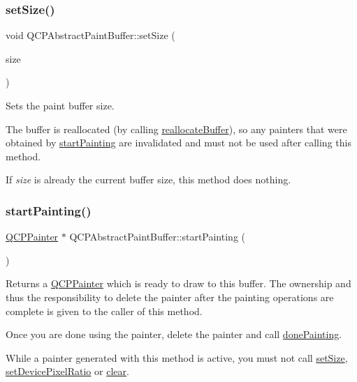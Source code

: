 \subsubsection{\texorpdfstring{set\+Size()}{setSize()}}
{\footnotesize\ttfamily void Q\+C\+P\+Abstract\+Paint\+Buffer\+::set\+Size (\begin{DoxyParamCaption}\item[{const Q\+Size \&}]{size }\end{DoxyParamCaption})}

Sets the paint buffer size.

The buffer is reallocated (by calling \hyperlink{class_q_c_p_abstract_paint_buffer_aee7506a52bd7e5a07c2af27935eb13e7}{reallocate\+Buffer}), so any painters that were obtained by \hyperlink{class_q_c_p_abstract_paint_buffer_a9e9f29b19c033cf02fb96f1a148463f3}{start\+Painting} are invalidated and must not be used after calling this method.

If {\itshape size} is already the current buffer size, this method does nothing. \mbox{\label{class_q_c_p_abstract_paint_buffer_a9e9f29b19c033cf02fb96f1a148463f3}} 
\subsubsection{\texorpdfstring{start\+Painting()}{startPainting()}}
{\footnotesize\ttfamily \hyperlink{class_q_c_p_painter}{Q\+C\+P\+Painter} $\ast$ Q\+C\+P\+Abstract\+Paint\+Buffer\+::start\+Painting (\begin{DoxyParamCaption}{ }\end{DoxyParamCaption})\hspace{0.3cm}{\ttfamily [pure virtual]}}

Returns a \hyperlink{class_q_c_p_painter}{Q\+C\+P\+Painter} which is ready to draw to this buffer. The ownership and thus the responsibility to delete the painter after the painting operations are complete is given to the caller of this method.

Once you are done using the painter, delete the painter and call \hyperlink{class_q_c_p_abstract_paint_buffer_a41b0dc6e7744f19fae09f8532c207dc1}{done\+Painting}.

While a painter generated with this method is active, you must not call \hyperlink{class_q_c_p_abstract_paint_buffer_a8b68c3cd36533f1a4a23b5ce8cd66f01}{set\+Size}, \hyperlink{class_q_c_p_abstract_paint_buffer_a555eaad5d5c806420ff35602a1bb68fa}{set\+Device\+Pixel\+Ratio} or \hyperlink{class_q_c_p_abstract_paint_buffer_a9e253f4541dfc01992b77e8830bd7722}{clear}.


